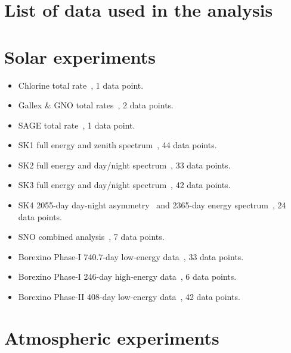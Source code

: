 \documentclass[a4paper, 11pt]{article}
\begin{document}
\section{List of data used in the analysis}
\label{sec:appendix}

\section*{Solar experiments}

\begin{itemize}
\setlength{\itemsep}{0mm}
\item Chlorine total rate~\cite{Cleveland:1998nv}, 1 data point.

\item Gallex \& GNO total rates~\cite{Kaether:2010ag}, 2 data points.

\item SAGE total rate~\cite{Abdurashitov:2009tn}, 1 data point.

\item SK1 full energy and zenith spectrum~\cite{Hosaka:2005um}, 44
  data points.

\item SK2 full energy and day/night spectrum~\cite{Cravens:2008aa}, 33
  data points.

\item SK3 full energy and day/night spectrum~\cite{Abe:2010hy}, 42
  data points.

\item SK4 2055-day day-night asymmetry~\cite{sksol:nakano2016} and
  2365-day energy spectrum~\cite{sksol:ichep2016}, 24 data points.

\item SNO combined analysis~\cite{Aharmim:2011vm}, 7 data points.

\item Borexino Phase-I 740.7-day low-energy
  data~\cite{Bellini:2011rx}, 33 data points.

\item Borexino Phase-I 246-day high-energy data~\cite{Bellini:2008mr},
  6 data points.

\item Borexino Phase-II 408-day low-energy
  data~\cite{Bellini:2014uqa}, 42 data points.
\end{itemize}

\section*{Atmospheric experiments}
\end{document}
